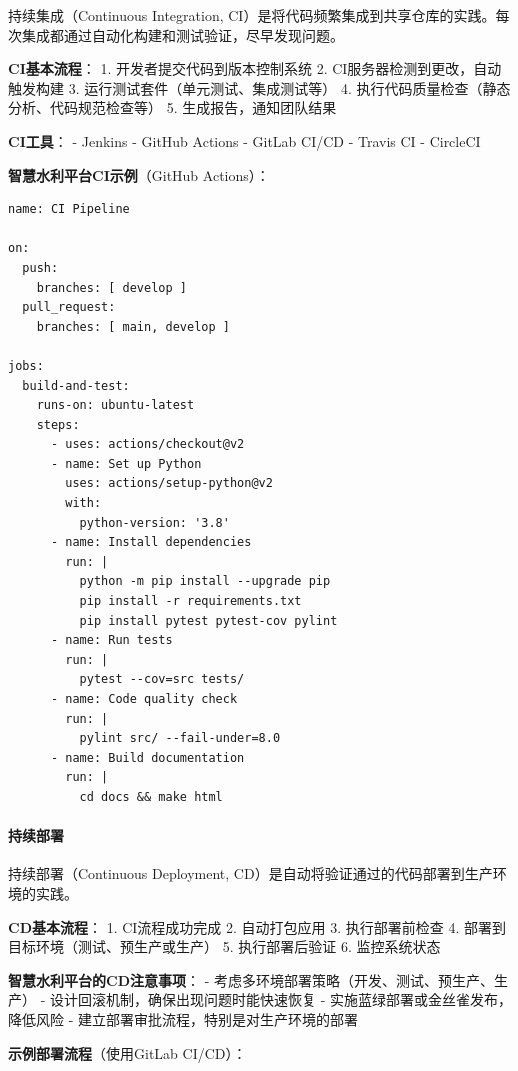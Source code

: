 持续集成（Continuous Integration,
CI）是将代码频繁集成到共享仓库的实践。每次集成都通过自动化构建和测试验证，尽早发现问题。

\textbf{CI基本流程}： 1. 开发者提交代码到版本控制系统 2.
CI服务器检测到更改，自动触发构建 3. 运行测试套件（单元测试、集成测试等）
4. 执行代码质量检查（静态分析、代码规范检查等） 5.
生成报告，通知团队结果

\textbf{CI工具}： - Jenkins - GitHub Actions - GitLab CI/CD - Travis CI
- CircleCI

\textbf{智慧水利平台CI示例}（GitHub Actions）：

\begin{lstlisting}
name: CI Pipeline

on:
  push:
    branches: [ develop ]
  pull_request:
    branches: [ main, develop ]

jobs:
  build-and-test:
    runs-on: ubuntu-latest
    steps:
      - uses: actions/checkout@v2
      - name: Set up Python
        uses: actions/setup-python@v2
        with:
          python-version: '3.8'
      - name: Install dependencies
        run: |
          python -m pip install --upgrade pip
          pip install -r requirements.txt
          pip install pytest pytest-cov pylint
      - name: Run tests
        run: |
          pytest --cov=src tests/
      - name: Code quality check
        run: |
          pylint src/ --fail-under=8.0
      - name: Build documentation
        run: |
          cd docs && make html
\end{lstlisting}

\paragraph{持续部署}\label{ux6301ux7eedux90e8ux7f72}

持续部署（Continuous Deployment,
CD）是自动将验证通过的代码部署到生产环境的实践。

\textbf{CD基本流程}： 1. CI流程成功完成 2. 自动打包应用 3.
执行部署前检查 4. 部署到目标环境（测试、预生产或生产） 5. 执行部署后验证
6. 监控系统状态

\textbf{智慧水利平台的CD注意事项}： -
考虑多环境部署策略（开发、测试、预生产、生产） -
设计回滚机制，确保出现问题时能快速恢复 -
实施蓝绿部署或金丝雀发布，降低风险 -
建立部署审批流程，特别是对生产环境的部署

\textbf{示例部署流程}（使用GitLab CI/CD）：

